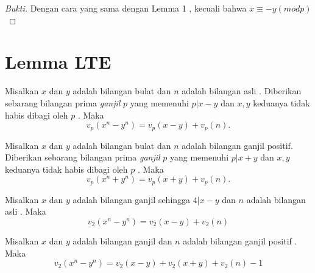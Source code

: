 \documentclass{article}
\begin{document}
\begin{proof}[Bukti]
Dengan cara yang sama dengan Lemma 1 , kecuali bahwa $x \equiv -y(mod p)$
\end{proof} 

\section{Lemma LTE}

\begin{lemma}
Misalkan $x$ dan $y$ adalah bilangan bulat dan $n$ adalah bilangan asli . Diberikan sebarang bilangan prima \textit{ganjil} $p$ yang memenuhi $p|x-y$ dan $x,y$ keduanya tidak habis dibagi oleh $p$ . Maka $$v_p(x^n-y^n)=v_p(x-y)+v_p(n).$$
\end{lemma}

\begin{lemma}
Misalkan $x$ dan $y$ adalah bilangan bulat dan $n$ adalah bilangan ganjil positif. Diberikan sebarang bilangan prima \textit{ganjil} $p$ yang memenuhi $p|x+y$ dan $x,y$ keduanya tidak habis dibagi oleh $p$ . Maka $$v_p(x^n+y^n)=v_p(x+y)+v_p(n).$$
\end{lemma}

\begin{lemma}
Misalkan $x$ dan $y$ adalah bilangan ganjil sehingga $4|x-y$ dan $n$ adalah bilangan asli . Maka $$v_2(x^n-y^n)=v_2(x-y)+v_2(n)$$
\end{lemma}

\begin{lemma}
Misalkan $x$ dan $y$ adalah bilangan ganjil dan $n$ adalah bilangan ganjil positif . Maka $$v_2(x^n-y^n)=v_2(x-y)+v_2(x+y)+v_2(n)-1$$
\end{lemma}
\end{document}
